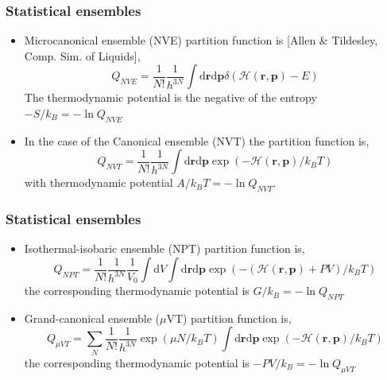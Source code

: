 \documentclass{beamer}
\begin{document}
\begin{frame}\frametitle{Statistical ensembles}

\begin{itemize}
\item Microcanonical ensemble (NVE) partition function is [Allen \& Tildesley, Comp. Sim. of Liquids],
	\begin{equation}
		Q_{NVE}= \frac{1}{N!}\frac{1}{h^{3N}} \int \textrm{d}\mathbf{r} \textrm{d}\mathbf{p} 
		\delta (\mathcal{H}(\mathbf{r},\mathbf{p}) -E)
	\end{equation}
	The thermodynamic potential is the negative of the entropy $-S/k_{B} = -\ln Q_{NVE}$

\item In the case of the Canonical ensemble (NVT) the partition function is,
	\begin{equation}
		Q_{NVT}= \frac{1}{N!}\frac{1}{h^{3N}} \int \textrm{d}\mathbf{r} \textrm{d}\mathbf{p} 
	        \exp (-\mathcal{H}(\mathbf{r},\mathbf{p})/k_B T)
	\end{equation}
	with thermodynamic potential $A/k_B T = -\ln Q_{NVT}$.


\end{itemize}

\end{frame}



\begin{frame}\frametitle{Statistical ensembles}

\begin{itemize}
\item Isothermal-isobaric ensemble (NPT) partition function is,
	\begin{equation}
		Q_{NPT}= \frac{1}{N!}\frac{1}{h^{3N}} \frac{1}{V_0} \int \textrm{d}V
		\int \textrm{d}\mathbf{r} \textrm{d}\mathbf{p} 
		\exp ( -(\mathcal{H}(\mathbf{r},\mathbf{p}) + PV)/k_BT)
	\end{equation}
	the corresponding thermodynamic potential is $G/k_{B} = -\ln Q_{NPT}$

\item Grand-canonical ensemble ($\mu$VT) partition function is,
	\begin{equation}
		Q_{\mu VT}= \sum_N \frac{1}{N!}\frac{1}{h^{3N}} \exp(\mu N/k_BT) 
		\int \textrm{d}\mathbf{r} \textrm{d}\mathbf{p} 
		\exp ( -\mathcal{H}(\mathbf{r},\mathbf{p}) /k_BT)
	\end{equation}
	the corresponding thermodynamic potential is $-PV/k_{B} = -\ln Q_{\mu VT}$

\end{itemize}

\end{frame}
\end{document}
